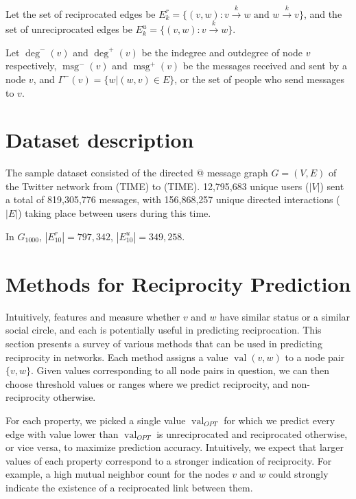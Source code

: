 \documentclass[conference]{IEEEtran}
\begin{document}
Let the set of reciprocated edges be \(E_k^r = \{ (v,w) : v \xrightarrow{k} w \text{ and } w \xrightarrow{k} v \} \), and the set of unreciprocated edges be \(E_k^u = \{ (v,w) : v \xrightarrow{k} w\} \).

Let $\deg^-(v)$ and $\deg^+(v)$ be the indegree and outdegree of node $v$ respectively, $\operatorname{msg}^-(v)$ and $\operatorname{msg}^+(v)$ be the messages received and sent by a node $v$, and $\Gamma^-(v) = \{w| (w,v) \in E\}$, or the set of people who send messages to $v$.

\section{Dataset description}
The sample dataset consisted of the directed @ message graph $G=(V,E)$ of the Twitter network from (TIME) to (TIME). 12,795,683 unique users ($|V|$) sent a total of 819,305,776 messages, with 156,868,257 unique directed interactions ($|E|$) taking place between users during this time.

In $G_{1000}$, $|E^r_{10}| = 797,342$, $|E^u_{10}| = 349,258$.

\section{Methods for Reciprocity Prediction}
Intuitively, features and measure whether $v$ and $w$ have similar status or a similar social circle, and each is potentially useful in predicting reciprocation. This section presents a survey of various methods that can be used in predicting reciprocity in networks. Each method assigns a value $\operatorname{val}(v,w)$ to a node pair $\{v,w\}$. Given values corresponding to all node pairs in question, we can then choose threshold values or ranges where we predict reciprocity, and non-reciprocity otherwise.

For each property, we picked a single value $\operatorname{val}_{OPT}$ for which we predict every edge with value lower than $\operatorname{val}_{OPT}$ is unreciprocated and reciprocated otherwise, or vice versa, to maximize prediction accuracy. Intuitively, we expect that larger values of each property correspond to a stronger indication of reciprocity. For example, a high mutual neighbor count for the nodes $v$ and $w$ could strongly indicate the existence of a reciprocated link between them.
\end{document}

